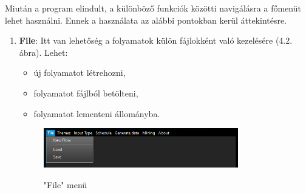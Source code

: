 
Miután a program elindult, a különböző funkciók közötti navigálásra a főmenüt lehet használni. Ennek a használata az alábbi pontokban kerül áttekintésre.
\begin{enumerate}
	\item{
		\textbf{File}: Itt van lehetőség a folyamatok külön fájlokként való kezelésére (4.2. ábra). Lehet:
		\begin{itemize}
			\item{új folyamatot létrehozni,}
			\item{folyamatot fájlból betölteni,}
			\item{folyamatot lementeni állományba.}
		\end{itemize}

		\begin{figure}[h]
			\begin{center}
				\includegraphics[width=0.8\textwidth, keepaspectratio=true]{images/img_ui_file}\\
				\caption{"File" menü}
				\label{fig:example}
			\end{center}
		\end{figure}

}
\end{enumerate}
